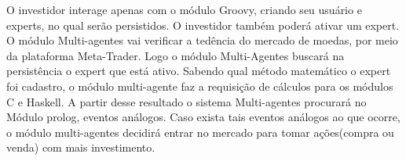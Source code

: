 O investidor interage apenas com o módulo Groovy, criando seu usuário e experts, no qual serão persistidos. O investidor também poderá ativar um expert.
O módulo Multi-agentes vai verificar a tedência do mercado de moedas, por meio da plataforma Meta-Trader. Logo o módulo Multi-Agentes buscará na persistência o expert que está ativo. Sabendo qual método matemático o expert foi cadastro, o módulo multi-agente faz a requisição de cálculos para os módulos C e Haskell. A partir desse resultado o sistema Multi-agentes procurará no Módulo prolog, eventos análogos. Caso exista tais eventos análogos ao que ocorre, o módulo multi-agentes decidirá entrar no mercado para tomar ações(compra ou venda) com mais investimento.
